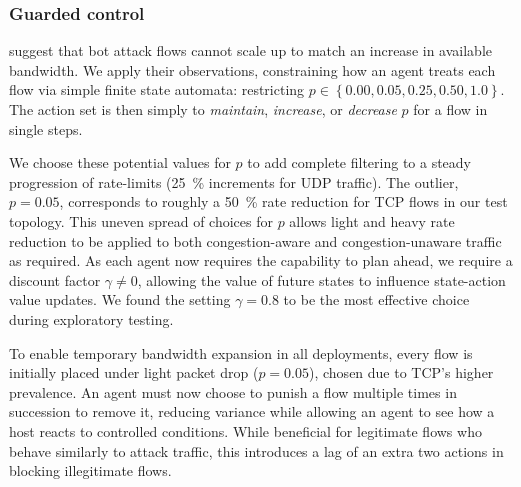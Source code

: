\documentclass[10pt, times, conference, letterpaper]{IEEEtran}
\begin{document}
\subsubsection{Guarded control}
\Textcite{DBLP:conf/ndss/KangGS16} suggest that bot attack flows cannot scale up to match an increase in available bandwidth.
We apply their observations, constraining how an agent treats each flow via simple finite state automata: restricting $p \in \left\{ 0.00, 0.05, 0.25, 0.50, 1.0 \right\}$.
The action set is then simply to \emph{maintain}, \emph{increase}, or \emph{decrease} $p$ for a flow in single steps.

We choose these potential values for $p$ to add complete filtering to a steady progression of rate-limits (\SI{25}{\percent} increments for UDP traffic).
The outlier, $p=0.05$, corresponds to roughly a \SI{50}{\percent} rate reduction for TCP flows in our test topology.
This uneven spread of choices for $p$ allows light and heavy rate reduction to be applied to both congestion-aware and congestion-unaware traffic as required.
As each agent now requires the capability to plan ahead, we require a discount factor $\gamma \ne 0$, allowing the value of future states to influence state-action value updates.
We found the setting $\gamma = 0.8$ to be the most effective choice during exploratory testing.

To enable temporary bandwidth expansion in all deployments, every flow is initially placed under light packet drop ($p=0.05$), chosen due to TCP's higher prevalence.
An agent must now choose to punish a flow multiple times in succession to remove it, reducing variance while allowing an agent to see how a host reacts to controlled conditions.
While beneficial for legitimate flows who behave similarly to attack traffic, this introduces a lag of an extra two actions in blocking illegitimate flows.
\end{document}
